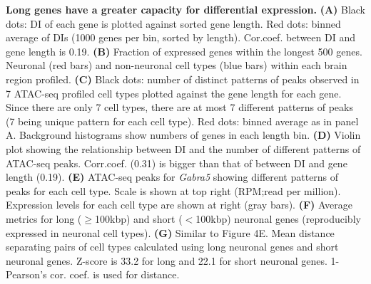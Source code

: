 \textbf{Long genes have a greater capacity for differential expression.}
\textbf{(A)} Black dots: DI of each gene is plotted against sorted gene length. Red dots: binned average of DIs (1000 genes per bin, sorted by length). Cor.coef. between DI and gene length is 0.19. 
\textbf{(B)} Fraction of expressed genes within the longest 500 genes. Neuronal (red bars) and non-neuronal cell types (blue bars) within each brain region profiled.
\textbf{(C)} Black dots: number of distinct patterns of peaks observed in 7 ATAC-seq profiled cell types plotted against the gene length for each gene. Since there are only 7 cell types, there are at most 7 different patterns of peaks (7 being unique pattern for each cell type). Red dots: binned average as in panel A. Background histograms show numbers of genes in each length bin. 
\textbf{(D)} Violin plot showing the relationship between DI and the number of different patterns of ATAC-seq peaks. Corr.coef. (0.31) is bigger than that of between DI and gene length (0.19).
\textbf{(E)} ATAC-seq peaks for \textit{Gabra5} showing different patterns of peaks for each cell type. Scale is shown at top right (RPM;read per million).  Expression levels for each cell type are shown at right (gray bars).
\textbf{(F)} Average metrics for long ($\geq$100kbp) and short ($<$100kbp) neuronal genes (reproducibly expressed in neuronal cell types). 
\textbf{(G)} Similar to Figure 4E. Mean distance separating pairs of cell types calculated using long neuronal genes and short neuronal genes. Z-score is 33.2 for long and 22.1 for short neuronal genes. 1-Pearson's cor. coef. is used for distance.
